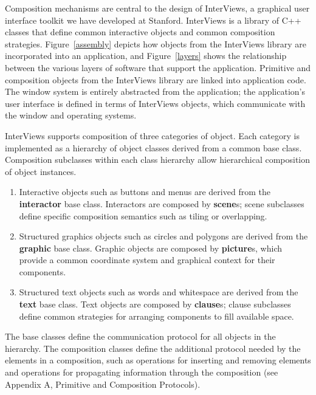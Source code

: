 \begin{figure*}
\vspace{3in}
\caption{Incorporating InterViews objects into an application}
\label{assembly}
\end{figure*}

\begin{figure*}
\vspace{2.5in}
\caption{Layers of software underlying an application}
\label{layers}
\end{figure*}

Composition mechanisms are central to the design of InterViews, a
graphical user interface toolkit we have developed at Stanford.
InterViews is a library of C++ \cite{c++} classes that define common
interactive objects and common composition strategies.
Figure~\ref{assembly} depicts how objects from the InterViews library
are incorporated into an application, and Figure~\ref{layers} shows
the relationship between the various layers of software that support
the application.  Primitive and composition objects from the
InterViews library are linked into application code.  The window
system is entirely abstracted from the application; the application's
user interface is defined in terms of InterViews objects, which 
communicate with the window and operating systems.

InterViews supports composition of three categories of object.  Each
category is implemented as a hierarchy of object classes derived from
a common base class.  Composition subclasses within each class
hierarchy allow hierarchical composition of object instances.
\begin{enumerate}

\item Interactive objects such as buttons and menus are derived 
from the {\bf interactor} base class.  Interactors are composed by {\bf
scene}s; scene subclasses define specific composition semantics such as tiling
or overlapping.

\item Structured graphics objects such as circles and polygons are
derived from the {\bf graphic} base class.  Graphic objects are composed
by {\bf picture}s, which provide a common coordinate system and graphical
context for their components.

\item Structured text objects such as words and whitespace are
derived from the {\bf text} base class.
Text objects are composed by {\bf clause}s;
clause subclasses define common strategies for arranging components to
fill available space.

\end{enumerate}
The base classes define the communication protocol for all
objects in the hierarchy.  The composition classes define the
additional protocol needed by the elements in a composition, such as
operations for inserting and removing elements and operations for
propagating information through the composition (see Appendix A,
Primitive and Composition Protocols).

